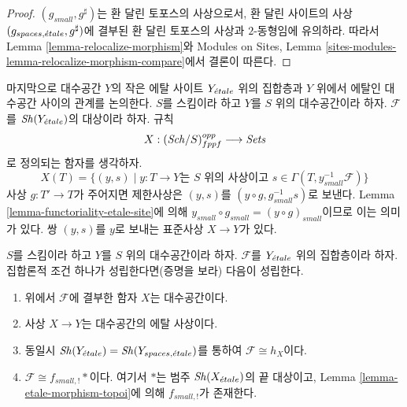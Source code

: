 \begin{proof}
$(g_{small}, g^\sharp)$는 환 달린 토포스의 사상으로서, 환 달린
사이트의 사상 $(g_{spaces, {\acute{e}tale}}, g^\sharp)$에 결부된 환 달린
토포스의 사상과 $2$-동형임에 유의하라. 따라서 Lemma
\ref{lemma-relocalize-morphism}와 Modules on Sites, Lemma
\ref{sites-modules-lemma-relocalize-morphism-compare}에서 결론이 따른다.
\end{proof}

\noindent
마지막으로 대수공간 $Y$의 작은 에탈 사이트 $Y_{\acute{e}tale}$ 위의 집합층과
$Y$ 위에서 에탈인 대수공간 사이의 관계를 논의한다. $S$를 스킴이라
하고 $Y$를 $S$ 위의 대수공간이라 하자. $\mathcal{F}$를
$\mathop{\mathit{Sh}}\nolimits(Y_{\acute{e}tale})$의 대상이라 하자. 규칙
$$
X : (\mathit{Sch}/S)_{fppf}^{opp} \longrightarrow \textit{Sets}
$$
로 정의되는 함자를 생각하자.
$$
X(T) = \{(y, s) \mid y : T \to Y\text{는 }S\text{ 위의 사상이고 }
s \in \Gamma(T, y_{small}^{-1}\mathcal{F})\}
$$
사상 $g : T' \to T$가 주어지면 제한사상은 $(y, s)$를
$(y \circ g, g_{small}^{-1}s)$로 보낸다. Lemma
\ref{lemma-functoriality-etale-site}에 의해
$y_{small} \circ g_{small} = (y \circ g)_{small}$이므로 이는 의미가
있다. 쌍 $(y, s)$를 $y$로 보내는 표준사상 $X \to Y$가 있다.

\begin{lemma}
\label{lemma-sheaf-gives-space}
$S$를 스킴이라 하고 $Y$를 $S$ 위의 대수공간이라 하자.
$\mathcal{F}$를 $Y_{\acute{e}tale}$ 위의 집합층이라 하자. 집합론적 조건 하나가
성립한다면(증명을 보라) 다음이 성립한다.
\begin{enumerate}
\item 위에서 $\mathcal{F}$에 결부한 함자 $X$는 대수공간이다.
\item 사상 $X \to Y$는 대수공간의 에탈 사상이다.
\item 동일시 $\mathop{\mathit{Sh}}\nolimits(Y_{\acute{e}tale}) = \mathop{\mathit{Sh}}\nolimits(Y_{spaces, {\acute{e}tale}})$를 통하여
$\mathcal{F} \cong h_X$이다.
\item $\mathcal{F} \cong f_{small, !}*$이다. 여기서 $*$는 범주
$\mathop{\mathit{Sh}}\nolimits(X_{\acute{e}tale})$의 끝 대상이고, Lemma
\ref{lemma-etale-morphism-topoi}에 의해 $f_{small, !}$가 존재한다.
\end{enumerate}
\end{lemma}

